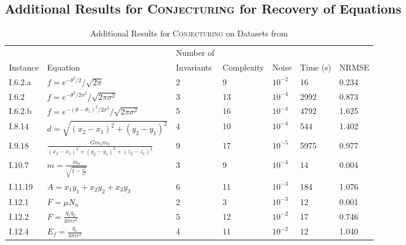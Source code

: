 \documentclass[ijds,nonblindrev]{informs-ijds}
\begin{document}
%
%
%
\newpage
\begin{APPENDICES}
\section{Additional Results for \textsc{Conjecturing} for Recovery of Equations}
\begin{table}[!ht]
{\footnotesize
\caption{\label{aif2}Additional Results for \textsc{Conjecturing} on Datasets from \citep{UdrescuTegmark20}}
\begin{tabular}{lllllll}
         &          & Number of  &            &         &           &   \\
Instance & Equation & Invariants & Complexity &  Noise  & Time (s)  & NRMSE  \\
\hline\hline
I.6.2.a & $f=e^{-\theta^2/2}/\sqrt{2\pi}$                            & 2 & 9  & $10^{-2}$  & 16    & 0.234 \\
I.6.2 & $f=e^{-\theta^2/2\sigma^2}/\sqrt{2\pi\sigma^2}$              & 3 & 13 & $10^{-4}$  & 2992  & 0.873 \\
I.6.2.b & $f=e^{-(\theta-\theta_1)^2/2\sigma^2}/\sqrt{2\pi\sigma^2}$ & 5 & 16 & $10^{-4}$  & 4792  & 1.625\\
I.8.14 & $d=\sqrt{(x_2-x_1)^2+(y_2-y_1)^2}$                          & 4 & 10 & $10^{-4}$  & 544   & 1.402\\
I.9.18 & $\frac{Gm_1m_2}{(x_2-x_1)^2+(y_2-y_1)^2+(z_2-z_1)^2}$       & 9 & 17 & $10^{-5}$  & 5975  & 0.977 \\
I.10.7 & $m=\frac{m_0}{\sqrt{1-\frac{v^2}{c^2}}}$                    & 3 & 9  & $10^{-4}$  & 14    & 0.004 \\
I.11.19 & $A=x_1y_1+x_2y_2+x_3y_3$                                   & 6 & 11 & $10^{-3}$  & 184   & 1.076\\
I.12.1 & $F=\mu N_n$                                                 & 2 & 3  & $10^{-3}$  & 12    & 0.001\\
I.12.2 & $F=\frac{q_1q_2}{4\pi\epsilon r^2}$                         & 5 & 12 & $10^{-2}$  & 17    & 0.746\\
I.12.4 & $E_f = \frac{q_1}{4\pi\epsilon r^2}$                        & 4 & 11 & $10^{-2}$  & 12    & 1.040 \\ \hline
\end{tabular}}


\end{table}
\end{APPENDICES}
\end{document}
